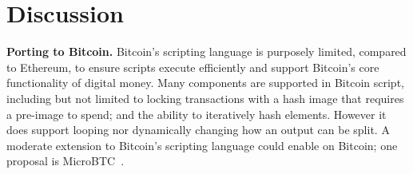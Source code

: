 



\section{Discussion}

\textbf{Porting to Bitcoin.} Bitcoin's scripting language is purposely limited, compared to Ethereum, to ensure scripts execute efficiently and support Bitcoin's core functionality of digital money. Many \pw components are supported in Bitcoin script, including but not limited to locking transactions with a hash image that requires a pre-image to spend; and the ability to iteratively hash elements. However it does support looping nor dynamically changing how an output can be split. A moderate extension to Bitcoin's scripting language could enable \pw on Bitcoin; one proposal is MicroBTC~\cite{Wan18}.

